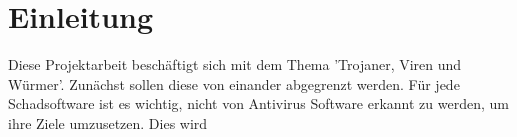 \section{Einleitung}\label{sec:einleitung}
Diese Projektarbeit beschäftigt sich mit dem Thema 'Trojaner, Viren und Würmer'. Zunächst sollen diese von einander abgegrenzt werden. 
Für jede Schadsoftware ist es wichtig, nicht von Antivirus Software erkannt zu werden, um ihre Ziele umzusetzen. 
Dies wird 